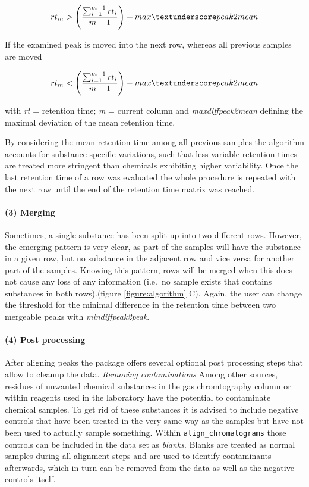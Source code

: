 \begin{equation}
rt_{m} > \left(\frac{\sum_{i=1}^{m-1}rt_{i}}{m-1}\right) + max\textunderscore peak2mean
\end{equation}

If the examined peak is moved into the next row, whereas all previous
samples are moved \par

\begin{equation}
rt_{m} < \left(\frac{\sum_{i=1}^{m-1}rt_{i}}{m-1}\right) - max\textunderscore peak2mean
\end{equation}

with \textit{rt} = retention time; \textit{m} = current column and
\textit{max\textunderscore diff\textunderscore peak2mean} defining the
maximal deviation of the mean retention time.

By considering the mean retention time among all previous samples the
algorithm accounts for substance specific variations, such that less
variable retention times are treated more stringent than chemicals
exhibiting higher variability. Once the last retention time of a row was
evaluated the whole procedure is repeated with the next row until the
end of the retention time matrix was reached.

\paragraph{(3) Merging}\label{merging}

Sometimes, a single substance has been split up into two different rows.
However, the emerging pattern is very clear, as part of the samples will
have the substance in a given row, but no substance in the adjacent row
and vice versa for another part of the samples. Knowing this pattern,
rows will be merged when this does not cause any loss of any information
(i.e.~no sample exists that contains substances in both rows).(figure
\ref{figure:algorithm} C). Again, the user can change the threshold for
the minimal difference in the retention time between two mergeable peaks
with \textit{min\textunderscore diff\textunderscore peak2peak}. \par 

\paragraph{(4) Post processing}\label{post-processing}

After aligning peaks the package offers several optional post processing
steps that allow to cleanup the data. \emph{Removing contaminations}
Among other sources, residues of unwanted chemical substances in the gas
chromtography column or within reagents used in the laboratory have the
potential to contaminate chemical samples. To get rid of these
substances it is advised to include negative controls that have been
treated in the very same way as the samples but have not been used to
actually sample something. Within \texttt{align\_chromatograms} those
controls can be included in the data set as \textit{blanks}. Blanks are
treated as normal samples during all alignment steps and are used to
identify contaminants afterwards, which in turn can be removed from the
data as well as the negative controls itself.

